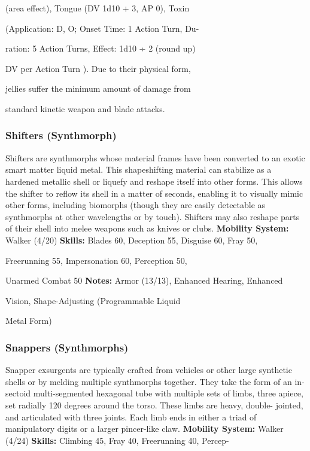 (area effect), Tongue (DV 1d10 + 3, AP 0), Toxin 

(Application: D, O; Onset Time: 1 Action Turn, Du-

ration: 5 Action Turns, Effect: 1d10 ÷ 2 (round up) 

DV per Action Turn ). Due to their physical form, 

jellies suffer the minimum amount of damage from 

standard kinetic weapon and blade attacks. 

\subsubsection{Shifters (Synthmorph)}

Shifters are synthmorphs whose material frames have 
been converted to an exotic smart matter liquid metal. 
This shapeshifting material can stabilize as a hardened 
metallic shell or liquefy and reshape itself into other 
forms. This allows the shifter to reflow its shell in a 
matter of seconds, enabling it to visually mimic other 
forms, including biomorphs (though they are easily 
detectable as synthmorphs at other wavelengths or by 
touch). Shifters may also reshape parts of their shell 
into melee weapons such as knives or clubs. 
\textbf{Mobility System: }Walker (4/20)
\textbf{Skills:} Blades 60, Deception 55, Disguise 60, Fray 50, 

Freerunning 55, Impersonation 60, Perception 50, 

Unarmed Combat 50 
\textbf{Notes: }Armor (13/13), Enhanced Hearing, Enhanced 

Vision, Shape-Adjusting (Programmable Liquid 

Metal Form)

\subsubsection{Snappers (Synthmorphs)}

Snapper exsurgents are typically crafted from vehicles 
or other large synthetic shells or by melding multiple 
synthmorphs together. They take the form of an in-
sectoid multi-segmented hexagonal tube with multiple 
sets of limbs, three apiece, set radially 120 degrees 
around the torso. These limbs are heavy, double-
jointed, and articulated with three joints. Each limb 
ends in either a triad of manipulatory digits or a larger 
pincer-like claw.
\textbf{Mobility System:} Walker (4/24)
\textbf{Skills:} Climbing 45, Fray 40, Freerunning 40, Percep-


